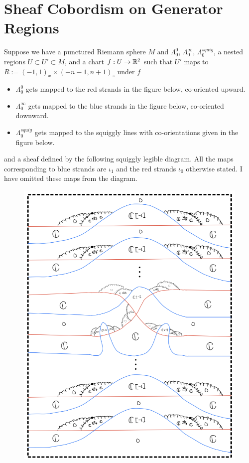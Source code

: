\section{Sheaf Cobordism on Generator Regions}
Suppose we have a punctured Riemann sphere $M$ and $\Lambda_0^0$, $\Lambda_0^\infty$, $\Lambda_0^{squig}$, a nested regions $U\subset U' \subset M$, and a chart $f : U \rightarrow \mathbb{R}^2$ such that $U'$ maps to $R:=(-1,1)_x \times (-n-1,n+1)_z$ under $f$
\begin{itemize}
\item $\Lambda_0^0$ gets mapped to the red strands in the figure below, co-oriented upward.

\item $\Lambda_0^\infty$ gets mapped to the blue strands in the figure below, co-oriented downward.

\item $\Lambda_0^{squig}$ gets mapped to the squiggly lines with co-orientations given in the figure below.
\end{itemize}
and a sheaf defined by the following squiggly legible diagram. All the maps corresponding to blue strands are $\iota_1$ and the red strands $\iota_0$ otherwise stated. I have omitted these maps from the diagram.\\

\begin{figure}[H]
    \centering
    \includegraphics[scale = 0.95]{diagrams/cobord_gen/1.png}
    \caption{}
    \label{fig:your-label}
\end{figure}

